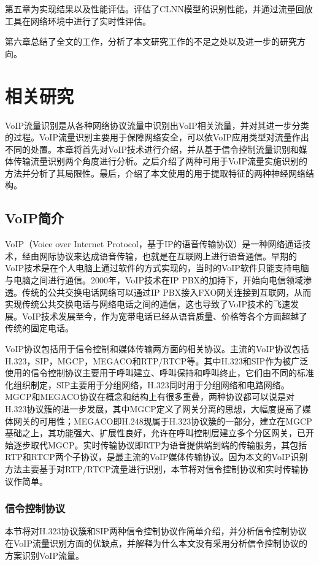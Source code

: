 第五章为实现结果以及性能评估。评估了CLNN模型的识别性能，并通过流量回放工具在网络环境中进行了实时性评估。

第六章总结了全文的工作，分析了本文研究工作的不足之处以及进一步的研究方向。


\chapter{相关研究}
VoIP流量识别是从各种网络协议流量中识别出VoIP相关流量，并对其进一步分类的过程。VoIP流量识别主要用于保障网络安全，可以依VoIP应用类型对流量作出不同的处置。本章将首先对VoIP技术进行介绍，并从基于信令控制流量识别和媒体传输流量识别两个角度进行分析。之后介绍了两种可用于VoIP流量实施识别的方法并分析了其局限性。最后，介绍了本文使用的用于提取特征的两种神经网络结构。

\section{VoIP简介}
VoIP（Voice over Internet Protocol，基于IP的语音传输协议）是一种网络通话技术，经由网际协议来达成语音传输，也就是在互联网上进行语音通信。早期的VoIP技术是在个人电脑上通过软件的方式实现的，当时的VoIP软件只能支持电脑与电脑之间进行通信。2000年，VoIP技术在IP PBX的加持下，开始向电信领域渗透。传统的公共交换电话网络可以通过IP PBX接入FXO网关连接到互联网，从而实现传统公共交换电话与网络电话之间的通信，这也导致了VoIP技术的飞速发展。VoIP技术发展至今，作为宽带电话已经从语音质量、价格等各个方面超越了传统的固定电话。

VoIP协议包括用于信令控制和媒体传输两方面的相关协议。主流的VoIP协议包括H.323，SIP，MGCP，MEGACO和RTP/RTCP等。其中H.323和SIP作为被广泛使用的信令控制协议主要用于呼叫建立、呼叫保持和呼叫终止，它们由不同的标准化组织制定，SIP主要用于分组网络，H.323同时用于分组网络和电路网络。MGCP和MEGACO协议在概念和结构上有很多重叠，两种协议都可以说是对H.323协议簇的进一步发展，其中MGCP定义了网关分离的思想，大幅度提高了媒体网关的可用性；MEGACO即H.248现属于H.323协议簇的一部分，建立在MGCP基础之上，其功能强大、扩展性良好，允许在呼叫控制层建立多个分区网关，已开始逐步取代MGCP。实时传输协议即RTP为语音提供端到端的传输服务，其包括RTP和RTCP两个子协议，是最主流的VoIP媒体传输协议。因为本文的VoIP识别方法主要基于对RTP/RTCP流量进行识别，本节将对信令控制协议和实时传输协议作简单。

\subsection{信令控制协议}
本节将对H.323协议簇和SIP两种信令控制协议作简单介绍，并分析信令控制协议在VoIP流量识别方面的优缺点，并解释为什么本文没有采用分析信令控制协议的方案识别VoIP流量。
